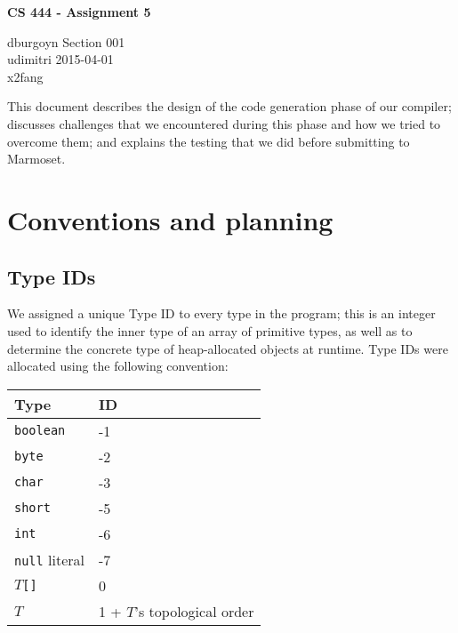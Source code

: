 \documentclass[12pt]{article}
\newcommand{\code}[1]{\texttt{#1}}
\begin{document}
\begin{center}
\textbf{\large{}CS 444 - Assignment 5}
\end{center}

\begin{flushleft}
dburgoyn \textbf{\hfill{}} Section 001 \\
udimitri \textbf{\hfill{}} 2015-04-01 \\
x2fang \\
\end{flushleft}


This document describes the design of the code generation phase of our compiler; discusses challenges that we encountered during this phase and how we tried to overcome them; and explains the testing that we did before submitting to Marmoset.

\section{Conventions and planning}

\subsection{Type IDs}

We assigned a unique Type ID to every type in the program; this is an integer used to identify the inner type of an array of primitive types, as well as to determine the concrete type of heap-allocated objects at runtime.  Type IDs were allocated using the following convention:

\begin{table}[h]
\begin{tabular}{ll}
\textbf{Type}       & \textbf{ID} \\
\hline           
\code{boolean}      & -1          \\
\code{byte}         & -2          \\
\code{char}         & -3          \\
\code{short}        & -5          \\
\code{int}          & -6          \\
\code{null} literal & -7          \\
$T$\code{[]}        & 0           \\
$T$                 & 1 + $T$'s topological order
\end{tabular}
\end{table}
\end{document}
